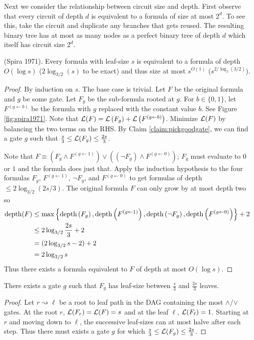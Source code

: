 \documentclass[11pt]{article}
\begin{document}
Next we consider the relationship between circuit size and depth. First observe that every circuit of depth $d$ is equivalent to a formula of size  at most $2^d$. To see this, take the circuit and duplicate any branches that gets reused. The resulting binary tree has at most as many nodes as a perfect binary tree of depth $d$ which itself has circuit size $2^d$.   
\begin{theorem}
	(Spira 1971). Every formula with leaf-size $s$ is equivalent to a formula of depth $O(\log s)$ ($2\log_{3/2}(s)$ to be exact) and thus size at most $s^{O(1)}$ ($s^{2/\log_2(3/2)}$).
\end{theorem}
\begin{proof}
	By induction on $s$. The base case is trivial. Let $F$ be the original formula and $g$ be some gate. Let $F_g$ be the sub-formula rooted at $g$. For $b \in \{0,1\}$, let $F^{(g \leftarrow b)}$ be the formula with $g$ replaced with the constant value $b$. See Figure \ref{fig:spira1971}. Note that $\operatorname*{\mathcal{L}}(F) = \operatorname*{\mathcal{L}}\left(F_g\right) + \operatorname*{\mathcal{L}}\left(F^{\left(g \leftarrow b\right)}\right)$. Minimize $\operatorname*{\mathcal{L}}(F)$ by balancing the two terms on the RHS. By Claim \ref{claim:pickgoodgate}, we can find a gate $g$ such that $\frac{s}{3} \leq \operatorname*{\mathcal{L}}(F_g) \leq \frac{2s}{3}$. 
	
	
	Note that $F \equiv \left(F_g \land F^{(g \leftarrow 1)}\right) \lor \left((\lnot F_g) \land F^{(g \leftarrow 0)}\right)$; $F_g$ must evaluate to $0$ or $1$ and the formula does just that. Apply the induction hypothesis to the four formulas $F_g$, $F^{(g \leftarrow 1)}$, $\lnot F_g$, and $F^{(g \leftarrow 0)}$ to get formulas of depth $\leq 2 \log_{3/2}(2s/3)$. The original formula $F$ can only grow by at most depth two so
	\begin{align*}
		\operatorname*{depth}(F) &\leq \max\left\{\operatorname*{depth}\left(F_g\right), \operatorname*{depth}\left(F^{(g \leftarrow 1)}\right), \operatorname*{depth}\left(\lnot F_g\right), \operatorname*{depth}\left(F^{(g \leftarrow 0)}\right)\right\} + 2\\
		&\leq 2\log_{3/2}\frac{2s}{3} + 2\\ 
		&= (2\log_{3/2}s - 2) + 2\\
		&= 2\log_{3/2}s
	\end{align*} 
	Thus there exists a formula equivalent to $F$ of depth at most $O(\log s)$.
\end{proof}

\begin{claim}
	\label{claim:pickgoodgate}
	There exists a gate $g$ such that $F_g$ has leaf-size between $\frac{s}{3}$ and $\frac{2s}{3}$ leaves.
\end{claim}
\begin{proof}
	Let $r \rightsquigarrow \ell$ be a root to leaf path in the DAG containing the most $\land$/$\lor$ gates. At the root $r$, $\operatorname*{\mathcal{L}}(F_r) = \operatorname*{\mathcal{L}}(F) = s$ and at the leaf $\ell$, $\operatorname*{\mathcal{L}}(F_{\ell}) = 1$. Starting at $r$ and moving down to $\ell$, the successive leaf-sizes can at most halve after each step. Thus there must exists a gate $g$ for which $\frac{s}{3} \leq \operatorname*{\mathcal{L}}(F_g) \leq \frac{2s}{3}$.
\end{proof}
\end{document}
